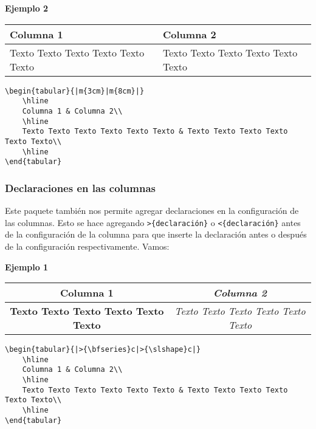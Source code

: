 	\textbf{Ejemplo 2}
	
	\begin{center}
		\begin{tabular}{|m{3cm}|m{8cm}|}
			\hline
			Columna 1 & Columna 2\\
			\hline		
			Texto Texto Texto Texto Texto Texto & Texto Texto Texto Texto Texto Texto\\
			\hline	
		\end{tabular}
	\end{center}
	
	\begin{myquote}
		\begin{lstlisting}
\begin{tabular}{|m{3cm}|m{8cm}|}
	\hline
	Columna 1 & Columna 2\\
	\hline		
	Texto Texto Texto Texto Texto Texto & Texto Texto Texto Texto Texto Texto\\
	\hline	
\end{tabular}				
		\end{lstlisting}
	\end{myquote}
	
	\subsubsection{Declaraciones en las columnas}
	
	Este paquete también nos permite agregar declaraciones en la configuración de las columnas. Esto se hace agregando \verb|>{declaración}| o \verb|<{declaración}| antes de la configuración de la columna para que inserte la declaración antes o después de la configuración respectivamente. Vamos:
	
	\textbf{Ejemplo 1}
	
	\begin{center}
		\begin{tabular}{|>{\bfseries}c|>{\slshape}c|}
			\hline
			Columna 1 & Columna 2\\
			\hline		
			Texto Texto Texto Texto Texto Texto & Texto Texto Texto Texto Texto Texto\\
			\hline	
		\end{tabular}
	\end{center}
	
	\begin{myquote}
		\begin{lstlisting}
\begin{tabular}{|>{\bfseries}c|>{\slshape}c|}
	\hline
	Columna 1 & Columna 2\\
	\hline		
	Texto Texto Texto Texto Texto Texto & Texto Texto Texto Texto Texto Texto\\
	\hline	
\end{tabular}				
		\end{lstlisting}
	\end{myquote}
	
